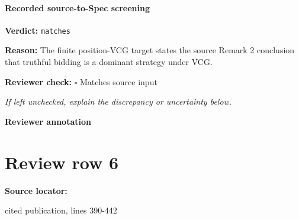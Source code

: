 \documentclass[10pt]{article}
\newcommand{\reviewerbox}{%
  \par\noindent\fbox{\parbox{0.96\linewidth}{\rule{0pt}{0.38in}}}\par
}
\newcommand{\reviewmatch}[1]{%
  \par\noindent\textbf{Reviewer check:} $\square$\; #1\par
  \noindent\emph{If left unchecked, explain the discrepancy or uncertainty below.}\par
}
\begin{document}
\paragraph{Recorded source-to-Spec screening}
\textbf{Verdict:} \texttt{matches}
\\
{\raggedright
\textbf{Reason:} The finite position-\allowbreak{}VCG target states the source Remark 2 conclusion that truthful bidding is a dominant strategy under VCG.\allowbreak{}
\par}
\reviewmatch{Matches source input}
\noindent\textbf{Reviewer annotation}\par
\reviewerbox
\clearpage
\hypertarget{source-claim-1951070cd567204e}{}
\section*{Review row 6}
\textbf{Source locator:} {\footnotesize\raggedright cited publication, lines 390-\allowbreak{}442\par}
\end{document}
